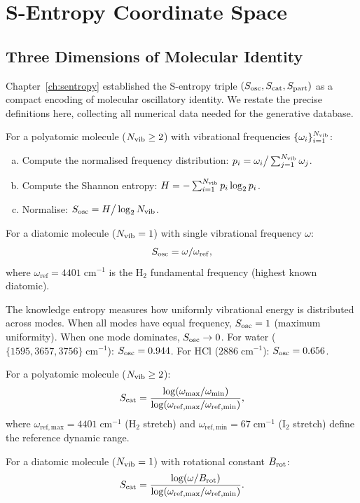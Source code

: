 \section{S-Entropy Coordinate Space}
\label{sec:ch23-sentropy}

\subsection{Three Dimensions of Molecular Identity}
\label{sec:ch23-three-dims}

Chapter~\ref{ch:sentropy} established the S-entropy triple $(S_{\mathrm{osc}}, S_{\mathrm{cat}}, S_{\mathrm{part}})$
as a compact encoding of molecular oscillatory identity.  We restate the
precise definitions here, collecting all numerical data needed for the
generative database.

\begin{definition}
\label{def:ch23-sk}
For a polyatomic molecule ($N_{\mathrm{vib}} \geq 2$) with vibrational frequencies
$\{\omega_i\}_{i=1}^{N_{\mathrm{vib}}}$:
\begin{enumerate}[(a)]
  \item Compute the normalised frequency distribution:
    $p_i = \omega_i \big/ \sum_{j=1}^{N_{\mathrm{vib}}} \omega_j$.
  \item Compute the Shannon entropy:
    $H = -\sum_{i=1}^{N_{\mathrm{vib}}} p_i \log_2 p_i$.
  \item Normalise: $S_{\mathrm{osc}} = H \big/ \log_2 N_{\mathrm{vib}}$.
\end{enumerate}
For a diatomic molecule ($N_{\mathrm{vib}} = 1$) with single vibrational frequency
$\omega$:
\[
  S_{\mathrm{osc}} = \omega / \omega_{\mathrm{ref}},
\]
where $\omega_{\mathrm{ref}} = 4401\;\mathrm{cm}^{-1}$ is the H$_2$
fundamental frequency (highest known diatomic).
\end{definition}

The knowledge entropy measures how uniformly vibrational energy is distributed
across modes.  When all modes have equal frequency, $S_{\mathrm{osc}} = 1$ (maximum
uniformity).  When one mode dominates, $S_{\mathrm{osc}} \to 0$.  For water
($\{1595, 3657, 3756\}\;\mathrm{cm}^{-1}$): $S_{\mathrm{osc}} = 0.944$.  For HCl
($2886\;\mathrm{cm}^{-1}$): $S_{\mathrm{osc}} = 0.656$.

\begin{definition}
\label{def:ch23-st}
For a polyatomic molecule ($N_{\mathrm{vib}} \geq 2$):
\[
  S_{\mathrm{cat}} = \frac{\log(\omega_{\max}/\omega_{\min})}
             {\log(\omega_{\mathrm{ref,max}}/\omega_{\mathrm{ref,min}})},
\]
where $\omega_{\mathrm{ref,max}} = 4401\;\mathrm{cm}^{-1}$ (H$_2$ stretch)
and $\omega_{\mathrm{ref,min}} = 67\;\mathrm{cm}^{-1}$ (I$_2$ stretch)
define the reference dynamic range.

For a diatomic molecule ($N_{\mathrm{vib}} = 1$) with rotational constant $B_{\mathrm{rot}}$:
\[
  S_{\mathrm{cat}} = \frac{\log(\omega/B_{\mathrm{rot}})}
             {\log(\omega_{\mathrm{ref,max}}/\omega_{\mathrm{ref,min}})}.
\]
\end{definition}

